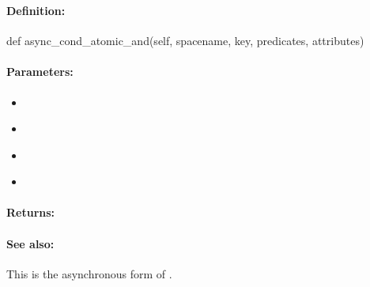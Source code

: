 \pagebreak
\subsubsection{}
\label{api:python:async_cond_atomic_and}


\paragraph{Definition:}
\begin{pythoncode}
def async_cond_atomic_and(self, spacename, key, predicates, attributes)
\end{pythoncode}

\paragraph{Parameters:}
\begin{itemize}[noitemsep]
\item {}\\

\item {}\\

\item {}\\

\item {}\\

\end{itemize}

\paragraph{Returns:}


\paragraph{See also:}  This is the asynchronous form of .

\pagebreak
\subsubsection{}
\label{api:python:group_atomic_and}


